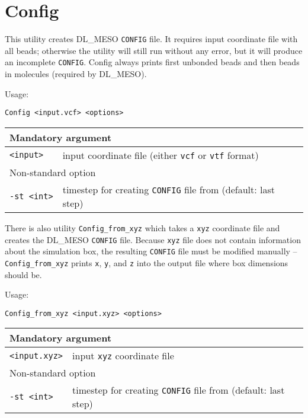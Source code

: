 \section{Config} \label{sec:Config}

This utility creates DL\_MESO \texttt{CONFIG} file. It requires input
coordinate file with all beads; otherwise the utility will still run
without any error, but it will produce an incomplete \texttt{CONFIG}.
Config always prints first unbonded beads and then beads in molecules
(required by DL\_MESO).

Usage:

\vspace{1em}
\noindent
\texttt{Config <input.vcf> <options>}

\vspace{1em}

\noindent
\begin{tabular}{p{}p{}}
  \toprule
  \multicolumn{2}{l}{Mandatory argument} \\
  \midrule
  \texttt{<input>}  & input coordinate file (either \texttt{vcf} or
    \texttt{vtf} format)\\
  \toprule
  \multicolumn{2}{l}{Non-standard option} \\
  \midrule
  \texttt{-st <int>} & timestep for creating \texttt{CONFIG} file from
    (default: last step) \\
  \bottomrule
\end{tabular}

\vspace{1em}
There is also utility \texttt{Config\_from\_xyz} which takes a \texttt{xyz}
coordinate file and creates the DL\_MESO \texttt{CONFIG} file. Because
\texttt{xyz} file does not contain information about the simulation box,
the resulting \texttt{CONFIG} file must be modified manually --
\texttt{Config\_from\_xyz} prints \texttt{x}, \texttt{y}, and \texttt{z}
into the output file where box dimensions should be.

Usage:

\vspace{1em}
\noindent
\texttt{Config\_from\_xyz <input.xyz> <options>}

\vspace{1em}

\noindent
\begin{tabular}{p{}p{}}
  \toprule
  \multicolumn{2}{l}{Mandatory argument} \\
  \midrule
  \texttt{<input.xyz>}  & input \texttt{xyz} coordinate file \\
  \toprule
  \multicolumn{2}{l}{Non-standard option} \\
  \midrule
  \texttt{-st <int>} & timestep for creating \texttt{CONFIG} file from
    (default: last step) \\
  \bottomrule
\end{tabular}
